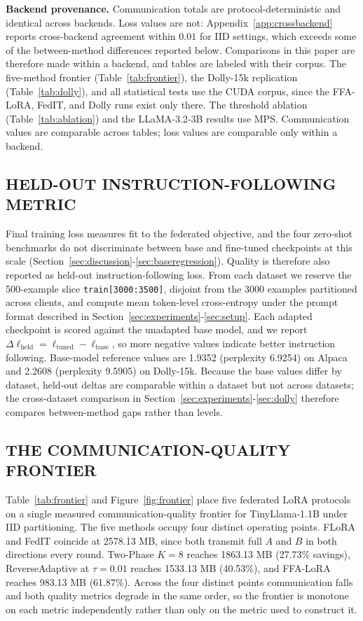\textbf{Backend provenance.} Communication totals are protocol-deterministic and identical across backends. Loss values are not: Appendix~\ref{app:crossbackend} reports cross-backend agreement within $0.01$ for IID settings, which exceeds some of the between-method differences reported below. Comparisons in this paper are therefore made within a backend, and tables are labeled with their corpus. The five-method frontier (Table~\ref{tab:frontier}), the Dolly-15k replication (Table~\ref{tab:dolly}), and all statistical tests use the CUDA corpus, since the FFA-LoRA, FedIT, and Dolly runs exist only there. The threshold ablation (Table~\ref{tab:ablation}) and the LLaMA-3.2-3B results use MPS. Communication values are comparable across tables; loss values are comparable only within a backend.

\subsection{HELD-OUT INSTRUCTION-FOLLOWING METRIC}
\label{sec:heldout}
Final training loss measures fit to the federated objective, and the four zero-shot benchmarks do not discriminate between base and fine-tuned checkpoints at this scale (Section~\ref{sec:discussion}-\ref{sec:baseregression}). Quality is therefore also reported as held-out instruction-following loss. From each dataset we reserve the 500-example slice \texttt{train[3000:3500]}, disjoint from the 3000 examples partitioned across clients, and compute mean token-level cross-entropy under the prompt format described in Section~\ref{sec:experiments}-\ref{sec:setup}. Each adapted checkpoint is scored against the unadapted base model, and we report $\Delta\ell_{\mathrm{held}} = \ell_{\mathrm{tuned}} - \ell_{\mathrm{base}}$, so more negative values indicate better instruction following. Base-model reference values are 1.9352 (perplexity 6.9254) on Alpaca and 2.2608 (perplexity 9.5905) on Dolly-15k. Because the base values differ by dataset, held-out deltas are comparable within a dataset but not across datasets; the cross-dataset comparison in Section~\ref{sec:experiments}-\ref{sec:dolly} therefore compares between-method gaps rather than levels.

\subsection{THE COMMUNICATION-QUALITY FRONTIER}
\label{sec:frontier}
Table~\ref{tab:frontier} and Figure~\ref{fig:frontier} place five federated LoRA protocols on a single measured communication-quality frontier for TinyLlama-1.1B \cite{zhang2024tinyllama} under IID partitioning. The five methods occupy four distinct operating points. FLoRA \cite{wang2024flora} and FedIT \cite{zhang2024federatedgpt} coincide at 2578.13 MB, since both transmit full $A$ and $B$ in both directions every round. Two-Phase $K{=}8$ reaches 1863.13 MB (27.73\% savings), ReverseAdaptive at $\tau{=}0.01$ reaches 1533.13 MB (40.53\%), and FFA-LoRA \cite{sun2024ffalora} reaches 983.13 MB (61.87\%). Across the four distinct points communication falls and both quality metrics degrade in the same order, so the frontier is monotone on each metric independently rather than only on the metric used to construct it.

